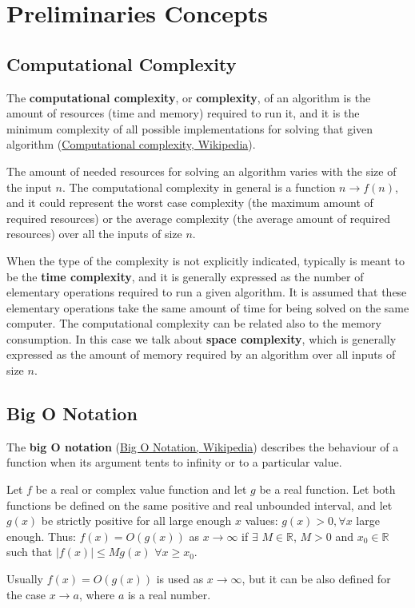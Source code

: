 \chapter{Preliminaries Concepts}
\label{preliminariesconcepts}

\section{Computational Complexity}
The \textbf{computational complexity}, or \textbf{complexity}, of an algorithm is the amount of resources (time and memory) required to run it, and it is the minimum complexity of all possible implementations for solving that given algorithm \cite{wikipediacomplexity} (\href{https://en.wikipedia.org/wiki/Computational_complexity}{Computational complexity, Wikipedia}).

The amount of needed resources for solving an algorithm varies with the size of the input \(n\). The computational complexity in general is a function \(n \rightarrow f(n)\), and it could represent the worst case complexity (the maximum amount of required resources) or the average complexity (the average amount of required resources) over all the inputs of size \(n\).

When the type of the complexity is not explicitly indicated, typically is meant to be the \textbf{time complexity}, and it is generally expressed as the number of elementary operations required to run a given algorithm. It is assumed that these elementary operations take the same amount of time for being solved on the same computer. The computational complexity can be related also to the memory consumption. In this case we talk about \textbf{space complexity}, which is generally expressed as the amount of memory required by an algorithm over all inputs of size \(n\).

\section{Big O Notation}
The \textbf{big O notation} \cite{wikipediabigo} (\href{https://en.wikipedia.org/wiki/Big_O_notation}{Big O Notation, Wikipedia}) describes the behaviour of a function when its argument tents to infinity or to a particular value.

\begin{definition}
Let \(f\) be a real or complex value function and let \(g\) be a real function. Let both functions be defined on the same positive and real unbounded interval, and let \(g(x)\) be strictly positive for all large enough \(x\) values: \(g(x) > 0, \forall x\) large enough. Thus: \(f(x)=O(g(x)) \) as \(x \rightarrow \infty \) if \(\exists\) \(M \in \mathbb{R} \), \(M>0\) and \(x_{0} \in \mathbb{R} \) such that \(|f(x)| \leq Mg(x)\) \(\forall x \geq x_{0}\). 
\end{definition}
Usually \(f(x)=O(g(x))\) is used as \(x \rightarrow \infty\), but it can be also defined for the case \(x \rightarrow a\), where \(a\) is a real number.

